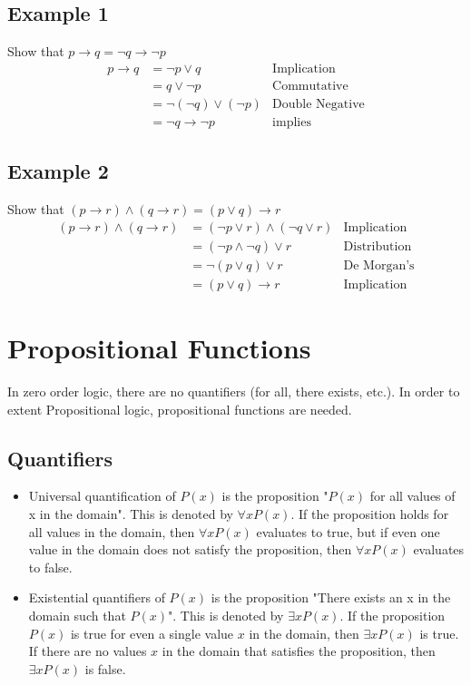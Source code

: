 \documentclass{article}
\theoremstyle{mytheoremstyle}
\theoremstyle{mytheoremstyle}
\theoremstyle{myproblemstyle}
\begin{document}
    \subsection*{Example 1}
    Show that $p \rightarrow q = \neg q \rightarrow \neg p$
    \begin{align*}
        p \rightarrow q &= \neg p \vee q  & \text{Implication} \\
                        &= q \vee \neg p & \text{Commutative} \\
                        &= \neg (\neg q) \vee (\neg p) & \text{Double Negative}\\
                        &= \neg q \rightarrow \neg p & \text{implies}
    \end{align*}

    \subsection*{Example 2}
    Show that $(p \rightarrow r) \wedge (q \rightarrow r) = (p \vee q) \rightarrow r$
    \begin{align*}
        (p \rightarrow r) \wedge (q \rightarrow r)
        &= (\neg p \vee r) \wedge (\neg q \vee r) & \text{Implication} \\
        &= (\neg p \wedge \neg q) \vee r & \text{Distribution} \\
        &= \neg (p \vee q) \vee r & \text{De Morgan's} \\
        &= (p \vee q) \rightarrow r & \text{Implication}
    \end{align*}

    \section*{Propositional Functions}
    In zero order logic, there are no quantifiers (for all, there exists, etc.).
    In order to extent Propositional logic, propositional functions are needed.
    \subsection*{Quantifiers}
    \begin{itemize}
        \item Universal quantification of $P(x)$ is the proposition "$P(x)$ for
            all values of x in the domain". This is denoted by $\forall x P(x)$.
            If the proposition holds for all values in the domain, then
            $\forall x P(x)$ evaluates to true, but if even one value in the
            domain does not satisfy the proposition, then $\forall x P(x)$
            evaluates to false.
        \item Existential quantifiers of $P(x)$ is the proposition "There exists
            an x in the domain such that $P(x)$". This is denoted by
            $\exists x P(x)$. If the proposition $P(x)$ is true for even a
            single value $x$ in the domain, then $\exists x P(x)$ is true. If
            there are no values $x$ in the domain that satisfies the
            proposition, then $\exists x P(x)$ is false.
    \end{itemize}
\end{document}
